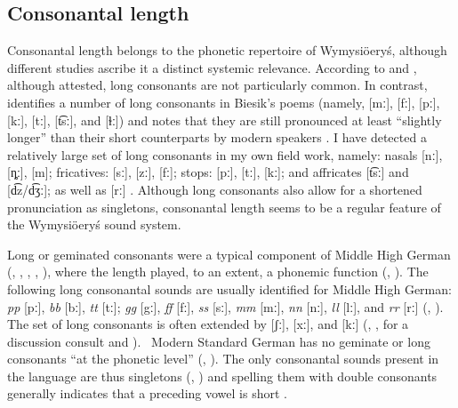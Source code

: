 \documentclass[output=paper,hidelinks]{langscibook}
\begin{document}
\subsection{Consonantal length}\label{sec:wymsorys:3.8}
\largerpage

Consonantal length belongs to the phonetic repertoire of Wymysiöeryś, although different studies ascribe it a distinct systemic relevance. According to \citet[15]{kleczkowski_dialekt_1920} and \citet[xv]{mojmir_worterbuch}, although attested, long consonants are not particularly common. In contrast, \citet[405--407]{wicherkiewicz_making_2003} identifies a number of long consonants in Biesik's poems (namely, [mː], [fː], [pː], [kː], [tː], [t͡sː], and [ɫː]) and notes that they are still pronounced at least ``slightly longer'' than their short counterparts by modern speakers \citet[407]{wicherkiewicz_making_2003}. I have detected a relatively large set of long consonants in my own field work, namely: nasals [nː], [ȵː], [m]; fricatives: [sː], [zː], [fː]; stops: [pː], [tː], [kː]; and affricates [t͡sː] and [d͡z/d͡ʒː]; as well as [rː]
\citep{Andrason2021}.
Although long consonants also allow for a shortened pronunciation as singletons, consonantal length seems to be a regular feature of the Wymysiöeryś sound system.

Long or geminated consonants were a typical component of Middle High German (\citealt[25, 27--28, 30--31]{wright_middle_1917}, \citealt[1134--1135]{simmler_phonetik_1985}, \citealt{goblirsch_voice_1997, goblirsch_lenition_2018}, \citealt[334]{jessen_phonetics_1998}, \citealt[141]{paul_mittelhochdeutsche_2007}), where the length played, to an extent, a phonemic function (\citealt[85--88]{fourquet_einige_1963}, \citealt{moosmuller_phonotactic_2015}). The following long consonantal sounds are usually identified for Middle High German: \textit{pp} [pː], \textit{bb} [bː], \textit{tt} [tː]; \textit{gg} [gː], \textit{ff} [fː], \textit{ss} [sː], \textit{mm} [mː], \textit{nn} [nː], \textit{ll} [lː], and \textit{rr} [rː] (\citealt[25]{wright_middle_1917}, \citealt[141]{paul_mittelhochdeutsche_2007}). The set of long consonants is often extended by [ʃː], [xː], and [kː] (\citealt[1135]{simmler_phonetik_1985}, \citealt[142, 171]{paul_mittelhochdeutsche_2007}, for a discussion consult \citealt{goblirsch_voice_1997, goblirsch_lenition_2018} and \citealt[141--175]{paul_mittelhochdeutsche_2007}).%
 ~Modern Standard German has no geminate or long consonants ``at the phonetic level'' (\citealt[70]{caratini_vocalic_2009}, \citealt{goblirsch_lenition_2018}). The only consonantal sounds present in the language are thus singletons (\citealt[70]{caratini_vocalic_2009}, \citealt{fagan_german_2009}) and spelling them with double consonants generally indicates that a preceding vowel is short \citep[118, 140]{russ_german_1994}.
\end{document}
